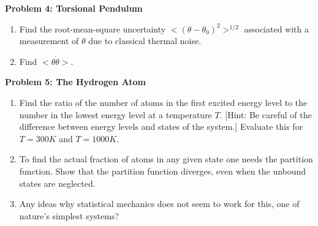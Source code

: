 \documentclass{article}
\begin{document}
\noindent \textbf{Problem 4: Torsional Pendulum}

\begin{enumerate}
	\item Find the root-mean-square uncertainty $< (\theta-\theta_0)^2 >^{1/2}$ associated with a measurement of $\theta$ due to classical thermal noise.
	\item Find $<\theta \dot{\theta}>$.
\end{enumerate}

\noindent \textbf{Problem 5: The Hydrogen Atom}

\begin{enumerate}
	\item Find the ratio of the number of atoms in the first excited energy level to the number in the lowest energy level at a temperature $T$. [Hint: Be careful of the difference between energy levels and states of the system.] Evaluate this for $T = 300K$ and $T = 1000K$.
	\item To find the actual fraction of atoms in any given state one needs the partition function. Show that the partition function diverges, even when the unbound states are neglected.
	\item Any ideas why statistical mechanics does not seem to work for this, one of nature’s simplest systems?
\end{enumerate}
\end{document}
